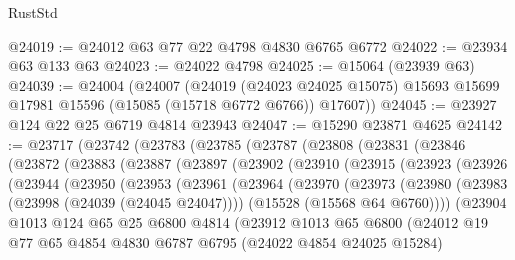 \begin{lexlean}{RustStd}
\begin{coremodule}
@24019 := @24012 @63 @77 @22 @4798 @4830 @6765 @6772
@24022 := @23934 @63 @133 @63
@24023 := @24022 @4798
@24025 := @15064 (@23939 @63)
@24039 := @24004
    (@24007
      (@24019
        (@24023 @24025 @15075)
        @15693
        @15699
        @17981
        @15596
        (@15085 (@15718 @6772 @6766))
        @17607))
@24045 := @23927 @124 @22 @25 @6719 @4814 @23943
@24047 := @15290 @23871 @4625
@24142 := @23717
    (@23742
      (@23783
        (@23785
          (@23787
            (@23808
              (@23831
                (@23846
                  (@23872
                    (@23883
                      (@23887
                        (@23897
                          (@23902
                            (@23910
                              (@23915
                                (@23923
                                  (@23926
                                    (@23944
                                      (@23950
                                        (@23953
                                          (@23961
                                            (@23964
                                              (@23970
                                                (@23973
                                                  (@23980
                                                    (@23983 (@23998 (@24039 (@24045 @24047))))
                                                    (@15528 (@15568 @64 @6760))))
                                                (@23904
                                                  @1013
                                                  @124
                                                  @65
                                                  @25
                                                  @6800
                                                  @4814
                                                  (@23912
                                                    @1013
                                                    @65
                                                    @6800
                                                    (@24012
                                                      @19
                                                      @77
                                                      @65
                                                      @4854
                                                      @4830
                                                      @6787
                                                      @6795
                                                      (@24022 @4854 @24025 @15284)

\end{coremodule}
\end{lexlean}
